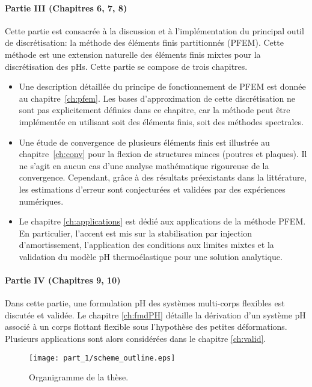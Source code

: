 \paragraph{Partie III (Chapitres 6, 7, 8)}
Cette partie est consacrée à la discussion et à l'implémentation du principal outil de discrétisation: la méthode des éléments finis partitionnés (PFEM). Cette méthode est une extension naturelle des éléments finis mixtes pour la discrétisation des pHs. Cette partie se compose de trois chapitres.
\begin{itemize}
\item Une description détaillée du principe de fonctionnement de PFEM est donnée au chapitre~\ref{ch:pfem}. Les bases d'approximation de cette discrétisation ne sont pas explicitement définies dans ce chapitre, car la méthode peut être implémentée en utilisant soit des éléments finis, soit des méthodes spectrales.
\item Une étude de convergence de plusieurs éléments finis est illustrée au chapitre~\ref{ch:conv} pour la flexion de structures minces (poutres et plaques). Il ne s'agit en aucun cas d'une analyse mathématique rigoureuse de la convergence. Cependant, grâce à des résultats préexistants dans la littérature, les estimations d'erreur sont conjecturées et validées par des expériences numériques.
\item Le chapitre \ref{ch:applications} est dédié aux applications de la méthode PFEM. En particulier, l'accent est mis sur la stabilisation par injection d'amortissement, l'application des conditions aux limites mixtes et la validation du modèle pH thermoélastique pour une solution analytique.
\end{itemize}

\paragraph {Partie IV (Chapitres 9, 10)}
Dans cette partie, une formulation pH des systèmes multi-corps flexibles est discutée et validée. Le chapitre \ref{ch:fmdPH} détaille la dérivation d'un système pH associé à un corps flottant flexible sous l'hypothèse des petites déformations. Plusieurs applications sont alors considérées dans le chapitre \ref{ch:valid}.


\begin{sidewaysfigure}
\centering
\texttt{[image: part\_1/scheme\_outline.eps]}%
\caption[]{Organigramme de la thèse.}%
\label{fig:organigramme}%
\end{sidewaysfigure}

